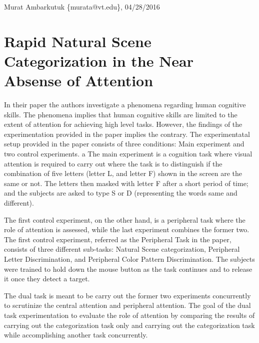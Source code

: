 \documentclass[11pt]{article}
\begin{document}
\thispagestyle{empty}
\begin{flushright}
	\small{Murat Ambarkutuk \{murata@vt.edu\}, 04/28/2016}
\end{flushright}
\section*{Rapid Natural Scene Categorization in the Near Absense of Attention}
In their paper the authors investigate a phenomena regarding human cognitive skills.
The phenomena implies that human cognitive skills are limited to the extent of attention for achieving high level tasks.
However, the findings of the experimentation provided in the paper implies the contrary.
The experimentatal setup provided in the paper consists of three conditions: Main experiment and two control experiments.
a
The main experiment is a cognition task where visual attention is required to carry out where the task is to distinguish if the combination of five letters (letter L, and letter F) shown in the screen are the same or not.
The letters then masked with letter F after a short period of time; and the subjects are asked to type S or D (representing the words same and different).

The first control experiment, on the other hand, is a peripheral task where the role of attention is assessed, while the last experiment combines the former two.
The first control experiment, referred as the Peripheral Task in the paper, consists of three different sub-tasks: Natural Scene categorization, Peripheral Letter Discrimination, and Peripheral Color Pattern Discrimination.
The subjects were trained to hold down the mouse button as the task continues and to release it once they detect a target.

The dual task is meant to be carry out the former two experiments concurrently to scrutinize the central attention and peripheral attention.
The goal of the dual task experimentation to evaluate the role of attention by comparing the results of carrying out the categorization task only and carrying out the categorization task while accomplishing another task concurrently.
\end{document}
